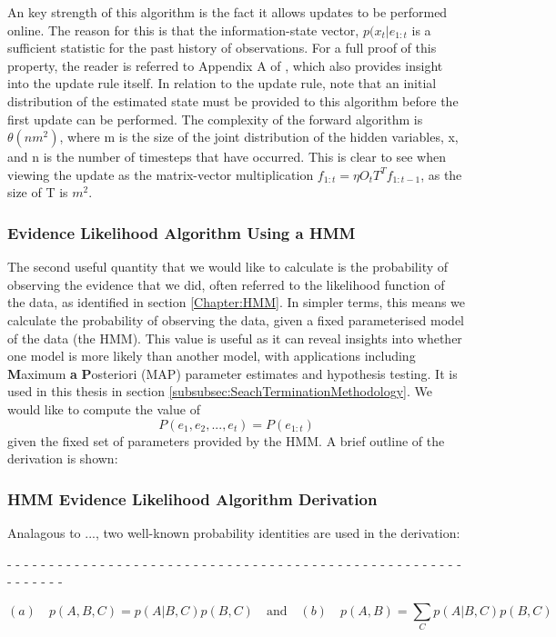An key strength of this algorithm is the fact it allows updates to be performed online. The reason for this is that the information-state vector, $p(x_t | e_{1:t}$ is a sufficient statistic for the past history of observations. For a full proof of this property, the reader is referred to Appendix A of \cite{Smallwood1973TheHorizon}, which also provides insight into the update rule itself. In relation to the update rule, note that an initial distribution of the estimated state must be provided to this algorithm before the first update can be performed. The complexity of the forward algorithm is $\theta (nm^2)$, where m is the size of the joint distribution of the hidden variables, x, and n is the number of timesteps that have occurred. This is clear to see when viewing the update as the matrix-vector multiplication $f_{1:t} = \eta O_{t} T^{T} f_{1:t-1}$, as the size of T is $m^2$.






\subsubsection{Evidence Likelihood Algorithm Using a HMM}\label{subsubsec:EvLikelihood}
The second useful quantity that we would like to calculate is the probability of observing the evidence that we did, often referred to the likelihood function of the data, as identified in section \ref{Chapter:HMM}. In simpler terms, this means we calculate the probability of observing the data, given a fixed parameterised model of the data (the HMM). This value is useful as it can reveal insights into whether one model is more likely than another model, with applications including \textbf{M}aximum \textbf{a} \textbf{P}osteriori (MAP) parameter estimates and hypothesis testing. It is used in this thesis in section \ref{subsubsec:SeachTerminationMethodology}. We would like to compute the value of
\[P(e_1, e_2, ..., e_t) = P(e_{1:t})\]
given the fixed set of parameters provided by the HMM. A brief outline of the derivation is shown: 


\subsubsection{HMM Evidence Likelihood Algorithm Derivation}\label{subsubsec:BGEvidenceLikelihood}

Analagous to ..., two well-known probability identities are used in the derivation: 
\begin{center}
- - - - - - - - - - - - - - - - - - - - - - - - - - - - - - - - - - - - - - - - - - - - - - - - - - - - - - - - - - - - - 
\end{center}
\[(a) \quad p(A, B, C) = p(A | B, C) p(B, C) \quad \text{and} \quad (b) \quad p(A, B) = \sum_{C}{p(A | B, C)p(B, C)}\]

